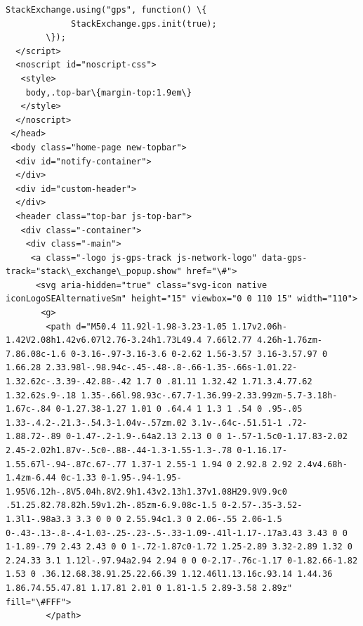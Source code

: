 \documentclass[11pt]{article}
\begin{document}
\begin{Verbatim}[commandchars=\\\{\}]
        StackExchange.using("gps", function() \{
             StackExchange.gps.init(true);
        \});
  </script>
  <noscript id="noscript-css">
   <style>
    body,.top-bar\{margin-top:1.9em\}
   </style>
  </noscript>
 </head>
 <body class="home-page new-topbar">
  <div id="notify-container">
  </div>
  <div id="custom-header">
  </div>
  <header class="top-bar js-top-bar">
   <div class="-container">
    <div class="-main">
     <a class="-logo js-gps-track js-network-logo" data-gps-track="stack\_exchange\_popup.show" href="\#">
      <svg aria-hidden="true" class="svg-icon native iconLogoSEAlternativeSm" height="15" viewbox="0 0 110 15" width="110">
       <g>
        <path d="M50.4 11.92l-1.98-3.23-1.05 1.17v2.06h-1.42V2.08h1.42v6.07l2.76-3.24h1.73L49.4 7.66l2.77 4.26h-1.76zm-7.86.08c-1.6 0-3.16-.97-3.16-3.6 0-2.62 1.56-3.57 3.16-3.57.97 0 1.66.28 2.33.98l-.98.94c-.45-.48-.8-.66-1.35-.66s-1.01.22-1.32.62c-.3.39-.42.88-.42 1.7 0 .81.11 1.32.42 1.71.3.4.77.62 1.32.62s.9-.18 1.35-.66l.98.93c-.67.7-1.36.99-2.33.99zm-5.7-3.18h-1.67c-.84 0-1.27.38-1.27 1.01 0 .64.4 1 1.3 1 .54 0 .95-.05 1.33-.4.2-.21.3-.54.3-1.04v-.57zm.02 3.1v-.64c-.51.51-1 .72-1.88.72-.89 0-1.47-.2-1.9-.64a2.13 2.13 0 0 1-.57-1.5c0-1.17.83-2.02 2.45-2.02h1.87v-.5c0-.88-.44-1.3-1.55-1.3-.78 0-1.16.17-1.55.67l-.94-.87c.67-.77 1.37-1 2.55-1 1.94 0 2.92.8 2.92 2.4v4.68h-1.4zm-6.44 0c-1.33 0-1.95-.94-1.95-1.95V6.12h-.8V5.04h.8V2.9h1.43v2.13h1.37v1.08H29.9V9.9c0 .51.25.82.78.82h.59v1.2h-.85zm-6.9.08c-1.5 0-2.57-.35-3.52-1.3l1-.98a3.3 3.3 0 0 0 2.55.94c1.3 0 2.06-.55 2.06-1.5 0-.43-.13-.8-.4-1.03-.25-.23-.5-.33-1.09-.41l-1.17-.17a3.43 3.43 0 0 1-1.89-.79 2.43 2.43 0 0 1-.72-1.87c0-1.72 1.25-2.89 3.32-2.89 1.32 0 2.24.33 3.1 1.12l-.97.94a2.94 2.94 0 0 0-2.17-.76c-1.17 0-1.82.66-1.82 1.53 0 .36.12.68.38.91.25.22.66.39 1.12.46l1.13.16c.93.14 1.44.36 1.86.74.55.47.81 1.17.81 2.01 0 1.81-1.5 2.89-3.58 2.89z" fill="\#FFF">
        </path>

\end{Verbatim}
\end{document}
